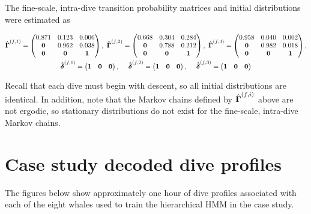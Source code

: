 \documentclass[12pt]{article}
\begin{document}
The fine-scale, intra-dive transition probability matrices and initial distributions were estimated as

\begin{gather}
    \hat {\boldsymbol{\Gamma}}^{(f,1)} = 
    \begin{pmatrix} 
    0.871 & 0.123 & 0.006 \\
    \bf{0} & 0.962 & 0.038 \\
    \bf{0} & \bf{0} & \bf{1}
    \end{pmatrix}, ~
    \hat {\boldsymbol{\Gamma}}^{(f,2)} = 
    \begin{pmatrix} 
    0.668 & 0.304 & 0.284 \\
    \bf{0} & 0.788 & 0.212 \\
    \bf{0} & \bf{0} & \bf{1}
    \end{pmatrix}, ~
    \hat {\boldsymbol{\Gamma}}^{(f,3)} = 
    \begin{pmatrix} 
    0.958 & 0.040 & 0.002 \\
    \bf{0} & 0.982 & 0.018 \\
    \bf{0} & \bf{0} & \bf{1}
    \end{pmatrix}, \\
    \hat {\boldsymbol{\delta}}^{(f,1)} = \begin{pmatrix} \bf{1} & \bf{0} & \bf{0} \end{pmatrix}, \quad ~
    \hat {\boldsymbol{\delta}}^{(f,2)} = \begin{pmatrix} \bf{1} & \bf{0} & \bf{0} \end{pmatrix}, \quad ~
    \hat {\boldsymbol{\delta}}^{(f,3)} = \begin{pmatrix} \bf{1} & \bf{0} & \bf{0} \end{pmatrix}
\end{gather}

Recall that each dive must begin with descent, so all initial distributions are identical. In addition, note that the Markov chains defined by $\hat {\boldsymbol{\Gamma}}^{(f,i)}$ above are not ergodic, so stationary distributions do not exist for the fine-scale, intra-dive Markov chains.

\section{Case study decoded dive profiles}

The figures below show approximately one hour of dive profiles associated with each of the eight whales used to train the hierarchical HMM in the case study.
\end{document}
